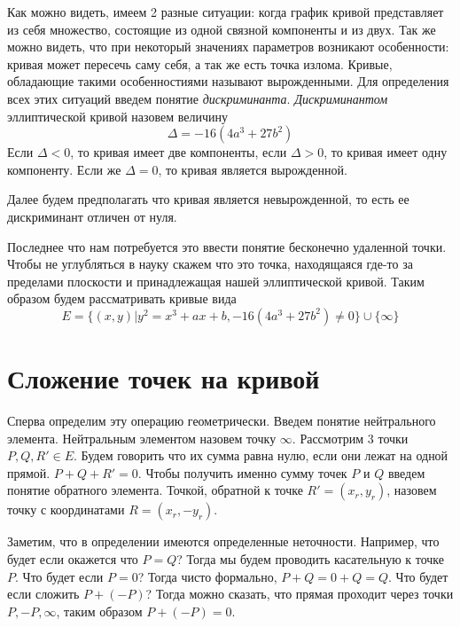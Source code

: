 \documentclass[a4paper,12pt]{article}
\begin{document}
        Как можно видеть, имеем 2 разные ситуации: когда график кривой представляет из себя множество, состоящие из одной связной 
        компоненты и из двух. Так же можно видеть, что при некоторый значениях параметров возникают особенности: кривая может пересечь саму себя,
        а так же есть точка излома. Кривые, обладающие такими особенностиями называют вырожденными. Для определения всех этих ситуаций введем
        понятие \textit{дискриминанта}. \textit{Дискриминантом} эллиптической кривой назовем величину 
        $$
            \Delta = -16(4a^3 + 27b^2)
        $$ 
        Если $\Delta < 0$, то кривая имеет две компоненты, если $\Delta > 0$, то кривая имеет одну компоненту. Если же
        $\Delta = 0$, то кривая является вырожденной.

        Далее будем предполагать что кривая является невырожденной, то есть ее дискриминант отличен от нуля. 

        Последнее что нам потребуется это ввести понятие бесконечно удаленной точки. Чтобы не углубляться в науку скажем что это точка, находящаяся где-то
        за пределами плоскости и принадлежащая нашей эллиптической кривой. Таким образом будем рассматривать кривые вида
        $$
            E = \{(x, y) | y^2 = x^3 + ax + b, -16(4a^3 + 27b^2) \neq 0\} \cup \{\infty\}
        $$

    \section{Сложение точек на кривой}
        Сперва определим эту операцию геометрически. Введем понятие нейтрального элемента. Нейтральным элементом назовем точку $\infty$. Рассмотрим 3 точки $P, Q, R' \in E$. Будем говорить что их
        сумма равна нулю, если они лежат на одной прямой. $P + Q + R' = 0$. Чтобы получить именно сумму точек $P$ и $Q$ введем понятие
        обратного элемента. Точкой, обратной к точке $R' = (x_r, y_r)$, назовем точку с координатами $R = (x_r, -y_r)$. 
        
        Заметим, что в определении имеются определенные неточности. Например, что будет если окажется что $P = Q$? Тогда мы будем проводить
        касательную к точке $P$. Что будет если $P = 0$? Тогда чисто формально, $P + Q = 0 + Q = Q$. Что будет если сложить $P + (-P)$? Тогда можно сказать, что
        прямая  проходит через точки $P, -P, \infty$, таким образом $P + (-P) = 0$.
\end{document}
